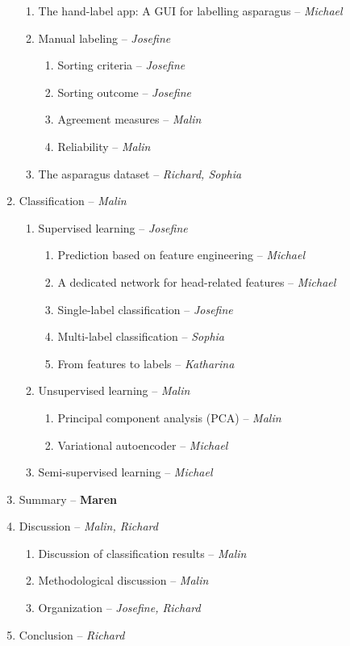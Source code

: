 \begin{enumerate}
\begin{enumerate}
	\item The hand-label app: A GUI for labelling asparagus -- \textit{Michael}
	\item Manual labeling -- \textit{Josefine}
		\begin{enumerate}
		\item Sorting criteria -- \textit{Josefine}
		\item Sorting outcome -- \textit{Josefine}
		\item Agreement measures -- \textit{Malin}
		\item Reliability -- \textit{Malin}
		\end{enumerate}
	\item The asparagus dataset -- \textit{Richard, Sophia}
	\end{enumerate}
\item Classification -- \textit{Malin}
	\begin{enumerate}
	\item Supervised learning -- \textit{Josefine}
		\begin{enumerate}
		\item Prediction based on feature engineering -- \textit{Michael}
		\item A dedicated network for head-related features -- \textit{Michael}
		\item Single-label classification -- \textit{Josefine}
		\item Multi-label classification -- \textit{Sophia}
		\item From features to labels -- \textit{Katharina}
		\end{enumerate}
	\item Unsupervised learning -- \textit{Malin}
		\begin{enumerate}
		\item Principal component analysis (PCA) -- \textit{Malin}
		\item Variational autoencoder -- \textit{Michael}
		\end{enumerate}
	\item Semi-supervised learning -- \textit{Michael}
	\end{enumerate}
\item Summary -- \textbf{Maren}
\item Discussion -- \textit{Malin, Richard}
	\begin{enumerate}
	\item Discussion of classification results -- \textit{Malin}
	\item Methodological discussion -- \textit{Malin}
	\item Organization -- \textit{Josefine, Richard}
	\end{enumerate}
\item Conclusion -- \textit{Richard}
\end{enumerate}
